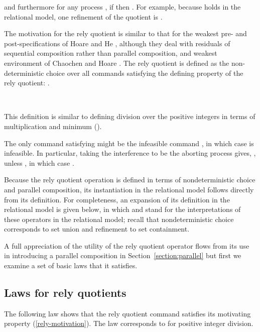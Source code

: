 \documentclass[fleqn]{fac}
\begin{document}
\begin{definitionx}[iteration]
\begin{lemmax}[induction]
and furthermore for any process , if  then .
For example, because 
holds in the relational model,
one refinement of the quotient 
is .

The motivation for the rely quotient is similar to that for 
the weakest pre- and post-specifications of Hoare and He \cite{HoareHe86},
although they deal with residuals of sequential composition rather than parallel composition,
and
weakest environment of Chaochen and Hoare \cite{ChaochenHoare81,Chaochen:1982}.
The rely quotient  is defined as the non-deterministic choice over all commands
 satisfying the defining property of the rely quotient:
.
\begin{definitionx}~~~

\end{definitionx}
This definition is similar to defining division over the positive integers in terms of multiplication
and minimum ().

The only command  satisfying  might be the infeasible command ,
in which case  is infeasible.
In particular, taking the interference  to be the aborting process  gives,
,
unless , in which case .

Because the rely quotient operation is defined in terms of nondeterministic choice and parallel composition,
its instantiation in the relational model follows directly from its definition.
For completeness, an expansion of its definition in the relational model is given below,
in which  and  stand for the interpretations of these operators in the relational model;
recall that nondeterministic choice corresponds to set union and refinement to set containment.

A full appreciation of the utility of the rely quotient operator flows from its use in 
introducing a parallel composition in Section~\ref{section:parallel}
but first we examine a set of basic laws that it satisfies.


\subsection{Laws for rely quotients}

The following law shows that the rely quotient command satisfies its motivating property (\ref{rely-motivation}).
The law corresponds to  for positive integer division.
\begin{lawx}~~~

\end{lawx}


\end{lemmax}
\end{definitionx}
\end{document}

